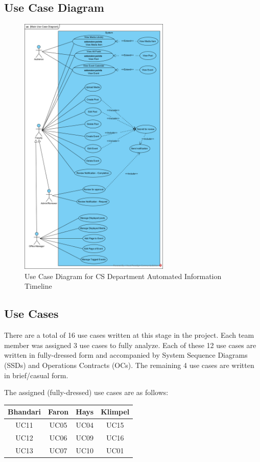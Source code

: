 \documentclass{article}
\begin{document}
\subsection{Use Case Diagram}
\begin{figure}[H]
    \centering
    \includegraphics[width=0.64\textwidth]{images/UCD.png}
    \centering
    \caption{Use Case Diagram for CS Department Automated Information Timeline}
\end{figure}
\subsection{Use Cases}
There are a total of 16 use cases written at this stage in the project. Each team member was assigned 3 use cases to fully analyze. Each of these 12 use cases are written in fully-dressed form and accompanied by System Sequence Diagrams (SSDs) and Operations Contracts (OCs). The remaining 4 use cases are written in brief/casual form.

The assigned (fully-dressed) use cases are as follows:

\begin{center}
    \begin{tabular}{ | c | c | c | c | }
        \hline
        Bhandari & Faron & Hays & Klimpel \\
        \hline
        UC11     & UC05  & UC04 & UC15    \\
        \hline
        UC12     & UC06  & UC09 & UC16    \\
        \hline
        UC13     & UC07  & UC10 & UC01    \\
        \hline
    \end{tabular}
\end{center}
\end{document}
